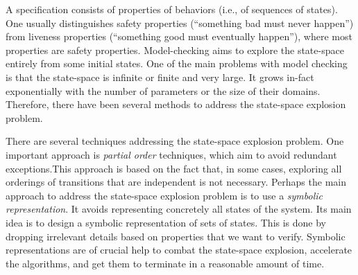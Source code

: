 A specification consists of properties of behaviors (i.e., of sequences of states). One usually distinguishes safety properties (``something bad must never happen'') from liveness properties (``something good must eventually happen''), where
   most properties are safety properties.
Model-checking aims to explore the state-space entirely from some initial states.
One of the main problems with model checking is that the state-space is infinite or finite and very
  large. It grows in-fact
exponentially with the number of parameters or the size of their
domains. Therefore, there have been several methods to address the
state-space explosion problem.

                   
There are several techniques addressing the state-space explosion problem.
One important approach is \emph{partial order} techniques, which aim to avoid
redundant exceptions.This approach is based on the fact that, in some cases, exploring all orderings of transitions that are independent is not necessary. Perhaps the main approach to address the state-space explosion problem is to use a
\emph{symbolic
  representation}. It avoids
   representing concretely all states of the system. 
Its main idea is to design a symbolic representation of sets of states.
This is done by dropping irrelevant details based on properties that we want to verify. Symbolic representations are of crucial help to combat the state-space explosion, accelerate the algorithms, and get them to terminate in a reasonable amount of time.

